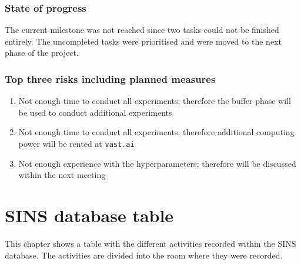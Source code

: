 \subsubsection{State of progress}
The current milestone was not reached since two tasks could not be finished entirely. The uncompleted tasks were prioritised and were moved to the next phase of the project.

\subsubsection{Top three risks including planned measures}
\begin{enumerate}
    \setlength\itemsep{0em}
    \item Not enough time to conduct all experiments; therefore the buffer phase will be used to conduct additional experiments
    \item Not enough time to conduct all experiments; therefore additional computing power will be rented at \texttt{vast.ai}
    \item Not enough experience with the hyperparameters; therefore will be discussed within the next meeting
\end{enumerate}

\clearpage
\section{SINS database table}
\label{app:SINS-Database-Table}
This chapter shows a table with the different activities recorded within the SINS database. The activities are divided into the room where they were recorded.

